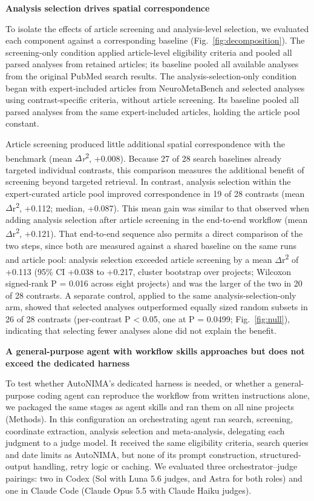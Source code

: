 \textbf{Analysis selection drives spatial correspondence}

To isolate the effects of article screening and analysis-level selection, we evaluated each component against a corresponding baseline (Fig.~\ref{fig:decomposition}). The screening-only condition applied article-level eligibility criteria and pooled all parsed analyses from retained articles; its baseline pooled all available analyses from the original PubMed search results. The analysis-selection-only condition began with expert-included articles from NeuroMetaBench and selected analyses using contrast-specific criteria, without article screening. Its baseline pooled all parsed analyses from the same expert-included articles, holding the article pool constant.

Article screening produced little additional spatial correspondence with the benchmark (mean $\Delta$\emph{r}\textsuperscript{2}, +0.008). Because 27 of 28 search baselines already targeted individual contrasts, this comparison measures the additional benefit of screening beyond targeted retrieval. In contrast, analysis selection within the expert-curated article pool improved correspondence in 19 of 28 contrasts (mean $\Delta$r\textsuperscript{2}, +0.112; median, +0.087). This mean gain was similar to that observed when adding analysis selection after article screening in the end-to-end workflow (mean $\Delta$r\textsuperscript{2}, +0.121). That end-to-end sequence also permits a direct comparison of the two steps, since both are measured against a shared baseline on the same runs and article pool: analysis selection exceeded article screening by a mean $\Delta$r\textsuperscript{2} of +0.113 (95\% CI +0.038 to +0.217, cluster bootstrap over projects; Wilcoxon signed-rank P = 0.016 across eight projects) and was the larger of the two in 20 of 28 contrasts. A separate control, applied to the same analysis-selection-only arm, showed that selected analyses outperformed equally sized random subsets in 26 of 28 contrasts (per-contrast P \textless{} 0.05, one at P = 0.0499; Fig.~\ref{fig:null}), indicating that selecting fewer analyses alone did not explain the benefit.

\textbf{A general-purpose agent with workflow skills approaches but does not exceed the dedicated harness}

To test whether AutoNIMA's dedicated harness is needed, or whether a general-purpose coding agent can reproduce the workflow from written instructions alone, we packaged the same stages as agent skills and ran them on all nine projects (Methods). In this configuration an orchestrating agent ran search, screening, coordinate extraction, analysis selection and meta-analysis, delegating each judgment to a judge model. It received the same eligibility criteria, search queries and date limits as AutoNIMA, but none of its prompt construction, structured-output handling, retry logic or caching. We evaluated three orchestrator--judge pairings: two in Codex (Sol with Luna 5.6 judges, and Astra for both roles) and one in Claude Code (Claude Opus 5.5 with Claude Haiku judges).

